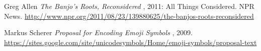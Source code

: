 \documentclass[12pt]{article}
\begin{document}
  \begin{thebibliography}{1}
     Greg Allen {\em The Banjo's Roots, Reconsidered } , 2011: All Things Considered. NPR News. \url{http://www.npr.org/2011/08/23/139880625/the-banjos-roots-reconsidered}

     Markus Scherer {\em Proposal for Encoding Emoji Symbols } , 2009. \url{https://sites.google.com/site/unicodesymbols/Home/emoji-symbols/proposal-text}
  \end{thebibliography}
\end{document}
